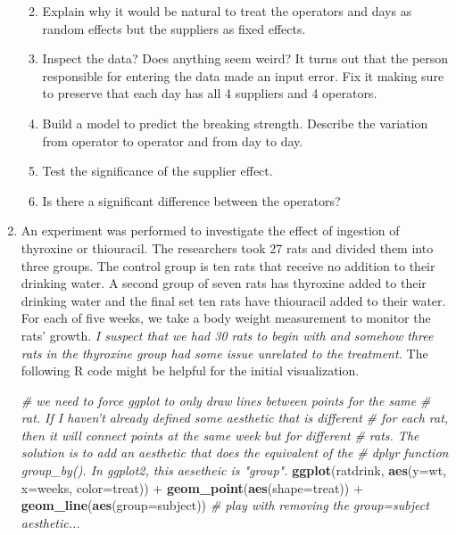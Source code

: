 \documentclass[]{book}
\newenvironment{Shaded}{\begin{snugshade}}{\end{snugshade}}
\newcommand{\KeywordTok}[1]{\textcolor[rgb]{0.13,0.29,0.53}{\textbf{{#1}}}}
\newcommand{\DataTypeTok}[1]{\textcolor[rgb]{0.13,0.29,0.53}{{#1}}}
\newcommand{\StringTok}[1]{\textcolor[rgb]{0.31,0.60,0.02}{{#1}}}
\newcommand{\CommentTok}[1]{\textcolor[rgb]{0.56,0.35,0.01}{\textit{{#1}}}}
\newcommand{\NormalTok}[1]{{#1}}
\providecommand{\tightlist}{%
  \setlength{\itemsep}{0pt}\setlength{\parskip}{0pt}}
\theoremstyle{definition}
\theoremstyle{definition}
\theoremstyle{remark}
\begin{document}
\begin{enumerate}
  \begin{enumerate}
  \def\labelenumii{\alph{enumii}.}
  \tightlist
  \item
    Explain why it would be natural to treat the operators and days as
    random effects but the suppliers as fixed effects.
  \item
    Inspect the data? Does anything seem weird? It turns out that the
    person responsible for entering the data made an input error. Fix it
    making sure to preserve that each day has all 4 suppliers and 4
    operators.
  \item
    Build a model to predict the breaking strength. Describe the
    variation from operator to operator and from day to day.
  \item
    Test the significance of the supplier effect.
  \item
    Is there a significant difference between the operators?
  \end{enumerate}
\item
  An experiment was performed to investigate the effect of ingestion of
  thyroxine or thiouracil. The researchers took 27 rats and divided them
  into three groups. The control group is ten rats that receive no
  addition to their drinking water. A second group of seven rats has
  thyroxine added to their drinking water and the final set ten rats
  have thiouracil added to their water. For each of five weeks, we take
  a body weight measurement to monitor the rats' growth. \emph{I suspect
  that we had 30 rats to begin with and somehow three rats in the
  thyroxine group had some issue unrelated to the treatment.} The
  following R code might be helpful for the initial visualization.

\begin{Shaded}
\begin{Highlighting}[]
\CommentTok{# we need to force ggplot to only draw lines between points for the same}
\CommentTok{# rat.  If I haven't already defined some aesthetic that is different}
\CommentTok{# for each rat, then it will connect points at the same week but for different}
\CommentTok{# rats. The solution is to add an aesthetic that does the equivalent of the}
\CommentTok{# dplyr function group_by(). In ggplot2, this aesetheic is "group". }
\KeywordTok{ggplot}\NormalTok{(ratdrink, }\KeywordTok{aes}\NormalTok{(}\DataTypeTok{y=}\NormalTok{wt, }\DataTypeTok{x=}\NormalTok{weeks, }\DataTypeTok{color=}\NormalTok{treat)) +}\StringTok{    }
\StringTok{  }\KeywordTok{geom_point}\NormalTok{(}\KeywordTok{aes}\NormalTok{(}\DataTypeTok{shape=}\NormalTok{treat)) +}
\StringTok{  }\KeywordTok{geom_line}\NormalTok{(}\KeywordTok{aes}\NormalTok{(}\DataTypeTok{group=}\NormalTok{subject))  }\CommentTok{# play with removing the group=subject aesthetic...}
\end{Highlighting}
\end{Shaded}


\end{enumerate}
\end{document}

